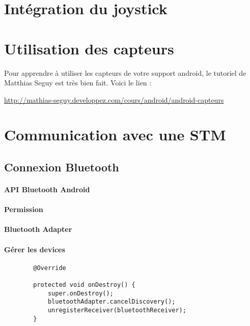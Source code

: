 \documentclass[a4paper,10pt]{article}
\begin{document}

\section{Intégration du joystick}


\section{Utilisation des capteurs}
Pour apprendre à utiliser les capteurs de votre support android, le tutoriel de Matthias Seguy est très bien fait. 
Voici le lien : 

\url{http://mathias-seguy.developpez.com/cours/android/android-capteurs}

\section{Communication avec une STM}

\subsection{Connexion Bluetooth}
	\paragraph{API Bluetooth Android}
	\paragraph{Permission}
	\paragraph{Bluetooth Adapter}
	
	\paragraph{Gérer les devices}
	\begin{lstlisting}
		@Override
		
		protected void onDestroy() {
  			super.onDestroy();
  			bluetoothAdapter.cancelDiscovery();
  			unregisterReceiver(bluetoothReceiver);
		}
	\end{lstlisting}
\end{document}
